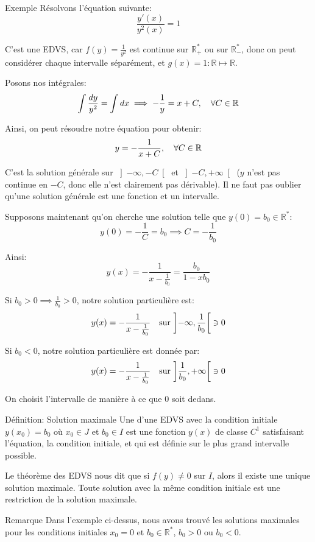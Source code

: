 \documentclass[a4paper]{article}
\begin{document}
\begin{parag}{Exemple}
    Résolvons l'équation suivante:
    \[\frac{y'\left(x\right)}{y^2\left(x\right)} = 1\]

    C'est une EDVS, car $f\left(y\right) = \frac{1}{y^2}$ est continue sur $\mathbb{R}^*_+$ ou sur $\mathbb{R}^*_-$, donc on peut considérer chaque intervalle séparément, et $g\left(x\right) = 1 : \mathbb{R} \mapsto \mathbb{R}$.

    Posons nos intégrales:
    \[\int \frac{dy}{y^2} = \int dx \implies -\frac{1}{y} = x + C, \quad \forall C \in \mathbb{R}\]

    Ainsi, on peut résoudre notre équation pour obtenir:
    \[y = -\frac{1}{x + C}, \quad \forall C \in \mathbb{R}\]

    C'est la solution générale sur $\left]-\infty, -C\right[ $ et $\left]-C, +\infty\right[ $ ($y$ n'est pas continue en $-C$, donc elle n'est clairement pas dérivable). Il ne faut pas oublier qu'une solution générale est une fonction et un intervalle.

    Supposons maintenant qu'on cherche une solution telle que $y\left(0\right) = b_0 \in \mathbb{R}^*$:
    \[y\left(0\right) = -\frac{1}{C} = b_0 \implies C = -\frac{1}{b_0}\]

    Ainsi:
    \[y\left(x\right) = - \frac{1}{x - \frac{1}{b_0}} = \frac{b_0}{1 - x b_0}\]

    Si $b_0 > 0 \implies \frac{1}{b_0} > 0$, notre solution particulière est:
    \[y\left(x\right) = -\frac{1}{x - \frac{1}{b_0}} \mathspace \text{sur } \left]-\infty, \frac{1}{b_0}\right[ \ni 0 \]

    Si $b_0 < 0$, notre solution particulière est donnée par:
    \[y\left(x\right) = - \frac{1}{x - \frac{1}{b_0}} \mathspace \text{sur } \left] \frac{1}{b_0}, +\infty\right[ \ni 0\]

    On choisit l'intervalle de manière à ce que $0$ soit dedans.
\end{parag}

\begin{parag}{Définition: Solution maximale}
    Une  d'une EDVS avec la condition initiale $y\left(x_0\right) = b_0$ où $x_0 \in J$ et $b_0 \in I$ est une fonction $y\left(x\right)$ de classe $C^1$ satisfaisant l'équation, la condition initiale, et qui est définie sur le plus grand intervalle possible.

    Le théorème des EDVS nous dit que si $f\left(y\right) \neq 0$ sur $I$, alors il existe une unique solution maximale. Toute solution avec la même condition initiale est une restriction de la solution maximale.

    \begin{subparag}{Remarque}
        Dans l'exemple ci-dessus, nous avons trouvé les solutions maximales pour les conditions initiales $x_0 = 0$ et $b_0 \in \mathbb{R}^*$, $b_0 > 0$ ou $b_0 < 0$.
    \end{subparag}
\end{parag}
\end{document}
